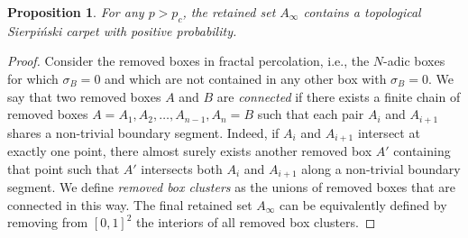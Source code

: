 \documentclass[a4paper]{article}
\numberwithin{equation}{section}
\newtheorem{proposition}[theorem]{Proposition}
\numberwithin{equation}{section}
\renewcommand{\1}{\mathbf{1}}
\begin{document}
\begin{proposition}\label{prop:super-sierpinski}
    For any $p>p_c$, the retained set $A_\infty$ contains a topological Sierpi\'nski carpet with positive probability.
\end{proposition}

\begin{proof}
    Consider the removed boxes in fractal percolation, i.e., the $N$-adic boxes for which $\sigma_B = 0$ and which are not contained in any other box with $\sigma_B = 0$. We say that two removed boxes $A$ and $B$ are \emph{connected} if there exists a finite chain of removed boxes $A = A_1, A_2, \ldots, A_{n-1}, A_n = B$ such that each pair $A_i$ and $A_{i+1}$ shares a non-trivial boundary segment. Indeed, if $A_i$ and $A_{i+1}$ intersect at exactly one point, there almost surely exists another removed box $A'$ containing that point such that $A'$ intersects both $A_i$ and $A_{i+1}$ along a non-trivial boundary segment. We define \emph{removed box clusters} as the unions of removed boxes that are connected in this way. The final retained set $A_\infty$ can be equivalently defined by removing from $[0,1]^2$ the interiors of all removed box clusters. 


\end{proof}
\end{document}

